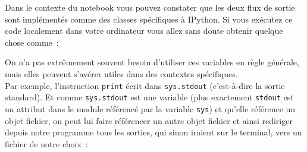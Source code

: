    Dans le contexte du notebook vous pouvez constater que les deux flux de
sortie sont implémentés comme des classes spécifiques à IPython. Si vous
exécutez ce code localement dans votre ordinateur vous allez sans doute
obtenir quelque chose comme~:

\begin{Shaded}
\begin{Highlighting}[]
\OperatorTok{<}\OperatorTok{=}\OperatorTok{=}\OperatorTok{=}\OperatorTok{>}
\OperatorTok{<}\OperatorTok{=}\OperatorTok{=}\OperatorTok{=}\OperatorTok{>}
\OperatorTok{<}\OperatorTok{=}\OperatorTok{=}\OperatorTok{=}\OperatorTok{>}
\end{Highlighting}
\end{Shaded}

    On n'a pas extrêmement souvent besoin d'utiliser ces variables en règle
générale, mais elles peuvent s'avérer utiles dans des contextes
spécifiques.\\

Par exemple, l'instruction \texttt{print} écrit dans \texttt{sys.stdout}
(c'est-à-dire la sortie standard). Et comme \texttt{sys.stdout} est une
variable (plus exactement \texttt{stdout} est un attribut dans le module
référencé par la variable \texttt{sys}) et qu'elle référence un objet
fichier, on peut lui faire référencer un autre objet fichier et ainsi
rediriger depuis notre programme tous les sorties, qui sinon iraient sur
le terminal, vers un fichier de notre choix~:

